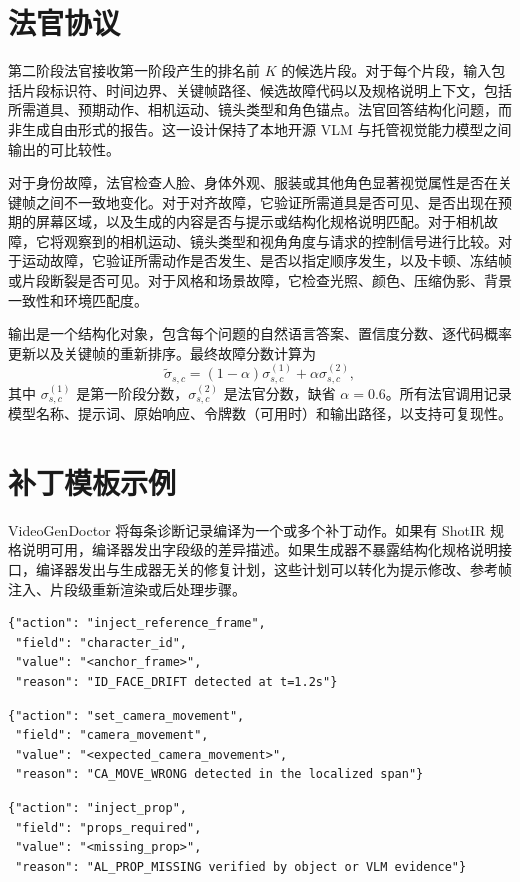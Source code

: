 \documentclass{article}
\begin{document}
\section{法官协议}
\label{app:judge}
第二阶段法官接收第一阶段产生的排名前 $K$ 的候选片段。对于每个片段，输入包括片段标识符、时间边界、关键帧路径、候选故障代码以及规格说明上下文，包括所需道具、预期动作、相机运动、镜头类型和角色锚点。法官回答结构化问题，而非生成自由形式的报告。这一设计保持了本地开源 VLM 与托管视觉能力模型之间输出的可比较性。

对于身份故障，法官检查人脸、身体外观、服装或其他角色显著视觉属性是否在关键帧之间不一致地变化。对于对齐故障，它验证所需道具是否可见、是否出现在预期的屏幕区域，以及生成的内容是否与提示或结构化规格说明匹配。对于相机故障，它将观察到的相机运动、镜头类型和视角角度与请求的控制信号进行比较。对于运动故障，它验证所需动作是否发生、是否以指定顺序发生，以及卡顿、冻结帧或片段断裂是否可见。对于风格和场景故障，它检查光照、颜色、压缩伪影、背景一致性和环境匹配度。

输出是一个结构化对象，包含每个问题的自然语言答案、置信度分数、逐代码概率更新以及关键帧的重新排序。最终故障分数计算为
\[
\tilde{\sigma}_{s,c} = (1-\alpha)\sigma^{(1)}_{s,c} + \alpha\sigma^{(2)}_{s,c},
\]
其中 $\sigma^{(1)}_{s,c}$ 是第一阶段分数，$\sigma^{(2)}_{s,c}$ 是法官分数，缺省 $\alpha=0.6$。所有法官调用记录模型名称、提示词、原始响应、令牌数（可用时）和输出路径，以支持可复现性。


\section{补丁模板示例}
\label{app:patch}
VideoGenDoctor 将每条诊断记录编译为一个或多个补丁动作。如果有 ShotIR 规格说明可用，编译器发出字段级的差异描述。如果生成器不暴露结构化规格说明接口，编译器发出与生成器无关的修复计划，这些计划可以转化为提示修改、参考帧注入、片段级重新渲染或后处理步骤。

\begin{verbatim}
{"action": "inject_reference_frame",
 "field": "character_id",
 "value": "<anchor_frame>",
 "reason": "ID_FACE_DRIFT detected at t=1.2s"}
\end{verbatim}

\begin{verbatim}
{"action": "set_camera_movement",
 "field": "camera_movement",
 "value": "<expected_camera_movement>",
 "reason": "CA_MOVE_WRONG detected in the localized span"}
\end{verbatim}

\begin{verbatim}
{"action": "inject_prop",
 "field": "props_required",
 "value": "<missing_prop>",
 "reason": "AL_PROP_MISSING verified by object or VLM evidence"}
\end{verbatim}
\end{document}
